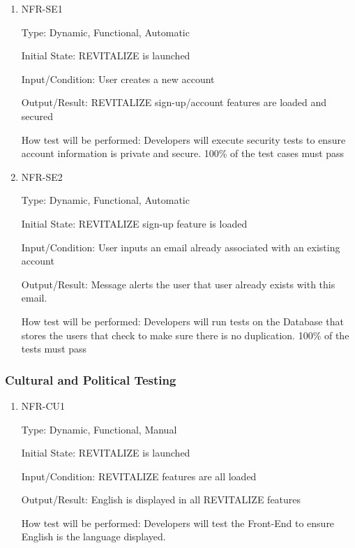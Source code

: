 \documentclass[12pt, titlepage]{article}
\begin{document}
\begin{enumerate}
	
	\item{NFR-SE1\\}
	
	Type: Dynamic, Functional, Automatic
	
	Initial State: REVITALIZE is launched
	
	Input/Condition: User creates a new account
	
	Output/Result: REVITALIZE sign-up/account features are loaded and secured  
	
	How test will be performed: Developers will execute security tests to ensure account information is private and secure. 100\% of the test cases must pass
	
	\item{NFR-SE2\\}
	
	Type: Dynamic, Functional, Automatic
	
	Initial State: REVITALIZE sign-up feature is loaded 
	
	Input/Condition: User inputs an email already associated with an existing account
	
	Output/Result: Message alerts the user that user already exists with this email.  
	
	How test will be performed: Developers will run tests on the Database that stores the users that check to make sure there is no duplication. 100\% of the tests must pass  
	
\end{enumerate}

\subsubsection{Cultural and Political Testing}

\begin{enumerate}
	
	\item{NFR-CU1\\}
	
	Type: Dynamic, Functional, Manual
	
	Initial State: REVITALIZE is launched
	
	Input/Condition: REVITALIZE features are all loaded
	
	Output/Result: English is displayed in all REVITALIZE features
	
	How test will be performed: Developers will test the Front-End to ensure English is the language displayed. 
	
	
\end{enumerate}
\end{document}
